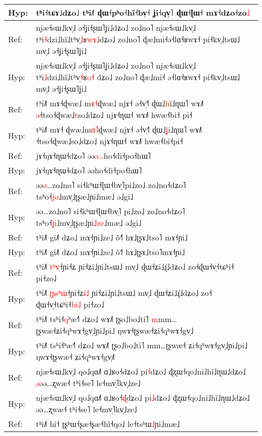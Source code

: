 \documentclass[10pt]{article}
\DeclareRobustCommand{\hl}[1]{{\textcolor{red}{#1}}}
\begin{document}
\begin{longtable}{ll}
Hyp: & tʰi˧tɕɤ˩dʑo˩ tʰi˩˥ ɖɯ˧pʰo˧hĩ˧bv̩˧ ʝi˧qv̩˥ ɖɯ˧ɭɯ˧ mɤ˧dʑo˧zo\hl{˩} \\ 
\midrule 
Ref: & njæ˧sɯ˩kv̩˩ ə˧ʝi˧ʂɯ˥ʝi˩dʑo˩ zo˩no˥ njæ˧sɯ˩kv̩˩ tʰi\hl{˧}dzi˩hĩ˩tʰv̩\hl{˩}ʁ\hl{w}\hl{ɤ}\hl{˩}dʑo˩ zo˩no˥ ɖæ˩mi˧ə˧lɑ˧ʁwɤ˧ pi˧kv̩˩tsɯ˩ mv̩˩ ə˧ʝi˧ʂɯ˥ʝi˩ \\ 
Hyp: & njæ˧sɯ˩kv̩˩ ə˧ʝi˧ʂɯ˥ʝi˩dʑo˩ zo˩no˥ njæ˧sɯ˩kv̩˩ tʰi\hl{˩}dzi˩hĩ˩tʰv̩\hl{˧}ʁ\hl{o}\hl{˧}\hl{ }dʑo˩ zo˩no˥ ɖæ˩mi˧\hl{ }ə˧lɑ˧ʁwɤ˧ pi˧kv̩˩tsɯ˩ mv̩˩ ə˧ʝi˧ʂɯ˥ʝi˩ \\ 
\midrule 
Ref: & tʰi˩˥ mɤ˧ɖwæ˩\hl{ }m\hl{ɤ}\hl{˧}ɖwæ˩ njɤ˧ ə˧v̩˧˥ ɖɯ˩\hl{h}i\hl{̃}˩ɳɯ˥ wɤ˩˥ \hl{ə}˧tso˧ɖwæ˩\hl{t}so˩dʑo˩ njɤ˧ɳɯ˧ wɤ˩˥ hwæ˧bi˧\hl{ }pi˧ \\ 
Hyp: & tʰi˩˥ mɤ˧\hl{ }ɖwæ˩m\hl{ɑ}\hl{˥}ɖwæ˩ njɤ˧ ə˧v̩˧˥ ɖɯ˩\hl{ʝ}i˩ɳɯ˥ wɤ˩˥ ˧tso˧ɖwæ˩so˩dʑo˩ njɤ˧ɳɯ˧ wɤ˩˥ hwæ˧bi˧pi˧ \\ 
\midrule 
Ref: & jɤ˧ŋɤ˧ɳɯ˧dʑo˥ əə\hl{ə}\hl{…}ho˧di˧po˧hɯ˥ \\ 
Hyp: & jɤ˧ŋɤ˧ɳɯ˧dʑo˥ əəho˧di˧po˧hɯ˥ \\ 
\midrule 
Ref: & əə\hl{ə}…zo˩no˥ si˧kʰɯ˧ɭɯ˧bv̩˥pi˩zo˩ zo˩no˧dʑo˥ tsʰo˧\hl{j}\hl{o}˩mv̩˩ʈʂæ˩ɲi˩mæ˩ ə˩gi˩ \\ 
Hyp: & əə…zo˩no˥ si˧kʰɯ˧ɭɯ˧bv̩˥\hl{ }pi˩zo˩ zo˩no˧dʑo˥ tsʰo˧\hl{ʝ}\hl{i}˩mv̩˩ʈʂæ˩ɲi\hl{˩}\hl{z}\hl{e}˩mæ˩ ə˩gi˩ \\ 
\midrule 
Ref: & tʰi˩˥ gi˩˥ dʑo˩ mɤ˧ɲi˩ze˩ õ˧˥ hɤ˩ʈʂɤ˩tso˥\hl{ }mɤ˧ɲi˩ \\ 
Hyp: & tʰi˩˥ gi˩˥ dʑo˩ mɤ˧ɲi˩ze˩ õ˧˥ hɤ˩ʈʂɤ˩tso˥mɤ˧ɲi˩ \\ 
\midrule 
Ref: & tʰi˩˥ \hl{t}\hl{ʰ}\hl{v}\hl{̩}˧ɲi˧ʑ ɲi˧ʑi˩ɲi˩tsɯ˩ mv̩˩ ɖɯ˧ʑi˩ɻ̍˩dʑo˩ zo˧ɖɯ˧v̩˧tɕʰi˧ pi˧zo˩ \\ 
Hyp: & tʰi˩˥ \hl{ʈ}\hl{ʂ}\hl{s}\hl{ʰ}\hl{ɯ}˧ɲi˧ʑ\hl{i}\hl{˩} ɲi˧ʑi˩ɲi˩tsɯ˩ mv̩˩ ɖɯ˧ʑi˩ɻ̍˩dʑo˩ zo˧\hl{ }ɖɯ˧v̩˧tɕʰi˧\hl{b}\hl{i}\hl{˩} pi˧zo˩ \\ 
\midrule 
Ref: & tʰi˩˥ tsʰi˧\hl{q}ʰæ˧˥ dʑo˩ wɤ˩˥ ʈʂo˩bo˩ti˥ \hl{m}mm…ʈʂwæ˧ʑi˧qʰwɤ˧gv̩˩ɲi˩pi˩ ŋwɤ˧ʈʂwæ˧ʑi˧qʰwɤ˧gv̩˩ \\ 
Hyp: & tʰi˩˥ tsʰi˧ʰæ˧˥ dʑo˩ wɤ˩˥ ʈʂo˩bo˩ti˥ mm…ʈʂwæ˧\hl{ }ʑi˧qʰwɤ˧gv̩˩ɲi˩pi˩ ŋwɤ˧ʈʂwæ˧\hl{ }ʑi˧qʰwɤ˧gv̩˩\hl{˥} \\ 
\midrule 
Ref: & njæ˧sɯ˩kv̩˩ qo˩qɑ˩˥ ɑ˩ʁo˧dʑo˩ pi\hl{˧}dʑo˩ ɖʐɯ˧qo˩ni˩hĩ˩ɳɯ˩dʑo˩ \hl{ə}əə…ʐwæ˧ tʰi˧se˥ le˧mv̩˥kv̩˩ze˩ \\ 
Hyp: & njæ˧sɯ˩kv̩˩ qo˩qɑ˩˥ ɑ˩ʁo˧\hl{ɖ}dʑo˩ pi\hl{˩}dʑo˩ ɖʐɯ˧qo˩ni˩hĩ˩ɳɯ˩dʑo˩ əə…ʐwæ˧ tʰi˧se˥ le˧mv̩˥kv̩˩ze˩ \\ 
\midrule 
Ref: & tʰi˩˥ hĩ˧ ʈʂʰɯ˧ʂæ˧ʂæ˧hĩ˧qo˩ le˧tsʰɯ\hl{˩}ɲi˩mæ˩ \\ 

\end{longtable}
\end{document}
